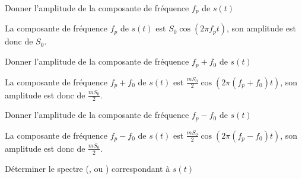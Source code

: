 \begin{enonce}
	Donner l'amplitude de la composante de fréquence $f_p$ de $s(t)$
\end{enonce}


\begin{corrige}
	La composante de fréquence $f_p$ de $s(t)$ est $S_0 \cos \left(2 \pi f_p t \right)$, son amplitude est donc de $S_0$.
\end{corrige}




\begin{enonce}
	Donner l'amplitude de la composante de fréquence $f_p + f_0$ de $s(t)$
\end{enonce}


\begin{corrige}
	La composante de fréquence $f_p+f_0$ de $s(t)$ est $\frac{mS_0}{2} \cos \left(2 \pi \left(f_p+f_0\right) t \right)$, son amplitude est donc de $\frac{mS_0}{2}$.
\end{corrige}



\begin{enonce}
	Donner l'amplitude de la composante de fréquence $f_p - f_0$ de $s(t)$
\end{enonce}


\begin{corrige}
	La composante de fréquence $f_p-f_0$ de $s(t)$ est $\frac{mS_0}{2} \cos \left(2 \pi \left(f_p-f_0\right) t \right)$, son amplitude est donc de $\frac{mS_0}{2}$.
\end{corrige}



\begin{enonce}
	Déterminer le spectre (\reponseA{}, \reponseB{} ou \reponseC{})  correspondant à $s(t)$
\end{enonce}

